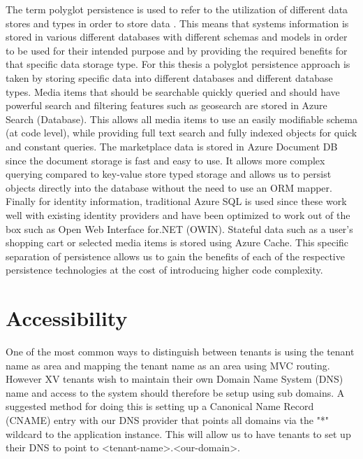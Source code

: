 The term polyglot persistence is used to refer to the utilization of different data stores and types in order to store data \cite{Sadalage2012-zw}. This means that systems information is stored in various different databases with different schemas and models in order to be used for their intended purpose and by providing the required benefits for that specific data storage type. For this thesis a polyglot persistence approach is taken by storing specific data into different databases and different database types. Media items that should be searchable quickly queried and should have powerful search and filtering features such as geosearch are stored in Azure Search (Database). This allows all media items to use an easily modifiable schema (at code level), while providing full text search and fully indexed objects for quick and constant queries. The marketplace data is stored in Azure Document DB since the document storage is fast and easy to use. It allows more complex querying compared to key-value store typed storage and allows us to persist objects directly into the database without the need to use an ORM mapper. Finally for identity information, traditional Azure SQL is used since these work well with existing identity providers and have been optimized to work out of the box such as Open Web Interface for.NET (OWIN). Stateful data such as a user's shopping cart or selected media items is stored using Azure Cache. This specific separation of persistence allows us to gain the benefits of each of the respective persistence technologies at the cost of introducing higher code complexity.


\section{Accessibility}

One of the most common ways to distinguish between tenants is using the tenant name as area and mapping the tenant name as an area using MVC routing. However XV tenants wish to maintain their own Domain Name System (DNS) name and access to the system should therefore be setup using sub domains. A suggested method for doing this is setting up a Canonical Name Record (CNAME) entry with our DNS provider that points all domains via the "*" wildcard to the application instance. This will allow us to have tenants to set up their DNS to point to <tenant-name>.<our-domain>.


